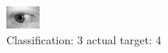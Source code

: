 \begin{figure}[h!]
\begin{center}
\includegraphics[width=0.60\columnwidth]{figures/ID732_class_3_target_4.png}
\end{center}
\caption{ Classification: 3 actual target: 4}
\label{fig:ID732_class_3_target_4}
\end{figure}
